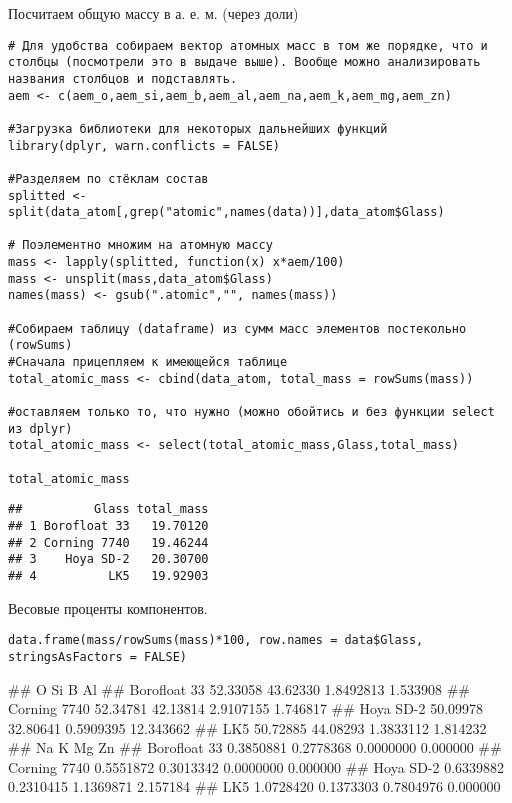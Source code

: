 Посчитаем общую массу в а. е. м. (через доли)

\begin{lstlisting}[language=Renhanced]
# Для удобства собираем вектор атомных масс в том же порядке, что и столбцы (посмотрели это в выдаче выше). Вообще можно анализировать названия столбцов и подставлять.
aem <- c(aem_o,aem_si,aem_b,aem_al,aem_na,aem_k,aem_mg,aem_zn)

#Загрузка библиотеки для некоторых дальнейших функций
library(dplyr, warn.conflicts = FALSE)

#Разделяем по стёклам состав
splitted <- split(data_atom[,grep("atomic",names(data))],data_atom$Glass)

# Поэлементно множим на атомную массу
mass <- lapply(splitted, function(x) x*aem/100)
mass <- unsplit(mass,data_atom$Glass)
names(mass) <- gsub(".atomic","", names(mass))

#Собираем таблицу (dataframe) из сумм масс элементов постекольно (rowSums)
#Сначала прицепляем к имеющейся таблице
total_atomic_mass <- cbind(data_atom, total_mass = rowSums(mass))

#оставляем только то, что нужно (можно обойтись и без функции select из dplyr)
total_atomic_mass <- select(total_atomic_mass,Glass,total_mass)

total_atomic_mass
\end{lstlisting}

\begin{lstlisting}
##          Glass total_mass
## 1 Borofloat 33   19.70120
## 2 Corning 7740   19.46244
## 3    Hoya SD-2   20.30700
## 4          LK5   19.92903
\end{lstlisting}

Весовые проценты компонентов.

\begin{lstlisting}[language=Renhanced]
data.frame(mass/rowSums(mass)*100, row.names = data$Glass, stringsAsFactors = FALSE)
\end{lstlisting}

\begin{Verb}
##                     O       Si         B        Al
## Borofloat 33 52.33058 43.62330 1.8492813  1.533908
## Corning 7740 52.34781 42.13814 2.9107155  1.746817
## Hoya SD-2    50.09978 32.80641 0.5909395 12.343662
## LK5          50.72885 44.08293 1.3833112  1.814232
##                     Na         K        Mg       Zn
## Borofloat 33 0.3850881 0.2778368 0.0000000 0.000000
## Corning 7740 0.5551872 0.3013342 0.0000000 0.000000
## Hoya SD-2    0.6339882 0.2310415 1.1369871 2.157184
## LK5          1.0728420 0.1373303 0.7804976 0.000000
\end{Verb}

